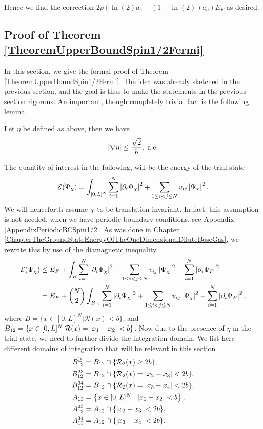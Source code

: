 Hence we find the correction $ 2\rho \left(\ln(2)a_e+(1-\ln(2))a_o\right)E_F $ as desired.
\subsection{Proof of Theorem \ref{TheoremUpperBoundSpin1/2Fermi}}
In this section, we give the formal proof of Theorem \ref{TheoremUpperBoundSpin1/2Fermi}. The idea was already sketched in the previous section, and the goal is thus to make the statements in the previous section rigorous. An important, though completely trivial fact is the following lemma. \begin{lemma}\label{LemmaEtaDerivative}
	Let $ \eta $ be defined as above, then we have \begin{equation}
	\left\lvert \nabla\eta \right\rvert\leq \frac{\sqrt{2}}{b}, \textnormal{ a.e}.
	\end{equation}
\end{lemma}
The quantity of interest in the following, will be the energy of the trial state\begin{equation}
\mathcal{E}(\Psi_\chi)=\int_{[0,L]^N}\sum_{i=1}^{N} \left\lvert \partial_i\Psi_\chi \right\rvert^2+\sum_{1\leq i<j\leq N}v_{ij}\left\lvert \Psi_\chi \right\rvert^2.
\end{equation}
We will henceforth assume $ \chi $ to be translation invariant. In fact, this assumption is not needed, when we have periodic boundary conditions, see Appendix \ref{AppendixPeriodicBCSpin1/2}.
As was done in Chapter \ref{ChapterTheGroundStateEnergyOfTheOneDimensionalDiluteBoseGas}, we rewrite this by use of the diamagnetic inequality\begin{equation}\label{EqEnergy1Spin1/2}
\begin{aligned}
\mathcal{E}(\Psi_\chi)&\leq E_F + \int_{B}\sum_{i=1}^{N}\left\lvert \partial_i\Psi_{\chi} \right\rvert^2+\sum_{1\leq i<j\leq N}v_{ij}\left\lvert \Psi_{\chi} \right\rvert^2-\sum_{i=1}^{N}\left\lvert \partial_i \Psi_F \right\rvert^2\\
&=E_F+\binom{N}{2}\int_{B_{12}}\sum_{i=1}^{N}\left\lvert \partial_i\Psi_{\chi} \right\rvert^2+\sum_{1\leq i<j\leq N}v_{ij}\left\lvert \Psi_{\chi} \right\rvert^2-\sum_{i=1}^{N}\left\lvert \partial_i \Psi_F \right\rvert^2,
\end{aligned}
\end{equation}
where $ B=\{x\in [0,L]^N \vert \mathcal{R}(x)<b\} $, and $ B_{12}=\{x\in [0,L]^N\vert \mathcal{R}(x)=\left\lvert x_1-x_2 \right\rvert<b\} $. Now due to the presence of $ \eta $ in the trial state, we need to further divide the integration domain. We list here different domains of integration that will be relevant in this section \begin{equation}
\begin{aligned}
B^{\geq}_{12}&=B_{12}\cap \{\mathcal{R}_2(x)\geq 2b\},\\
B^{23}_{12}&=B_{12}\cap\{\mathcal{R}_2(x)=\left\lvert x_2-x_3 \right\rvert<2b\},\\
B^{34}_{12}&=B_{12}\cap\{\mathcal{R}_2(x)=\left\lvert x_3-x_4 \right\rvert<2b\},\\
A_{12}&=\left\{x\in [0,L]^N\ \big\vert \left\lvert x_1-x_2 \right\rvert<b\right\},\\
A_{12}^{23}&=A_{12}\cap \{\left\lvert x_2-x_3 \right\rvert<2b\},\\
A_{12}^{34}&=A_{12}\cap \{\left\lvert x_3-x_4 \right\rvert<2b\}.
\end{aligned}
\end{equation} 
